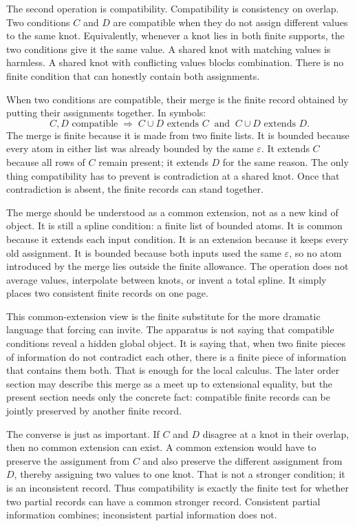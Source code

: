 The second operation is compatibility. Compatibility is consistency on overlap.
Two conditions \(C\) and \(D\) are compatible when they do not assign different
values to the same knot. Equivalently, whenever a knot lies in both finite
supports, the two conditions give it the same value. A shared knot with matching
values is harmless. A shared knot with conflicting values blocks combination.
There is no finite condition that can honestly contain both assignments.

When two conditions are compatible, their merge is the finite record obtained
by putting their assignments together. In symbols:
\[
  C, D \text{ compatible}
  \;\Longrightarrow\;
  C \cup D \text{ extends } C \ \text{ and }\ C \cup D \text{ extends } D.
\]
The merge is finite because it is made from two finite lists. It is bounded
because every atom in either list was already bounded by the same
\(\varepsilon\). It extends \(C\) because all rows of \(C\) remain present; it
extends \(D\) for the same reason. The only thing compatibility has to prevent
is contradiction at a shared knot. Once that contradiction is absent, the
finite records can stand together.

The merge should be understood as a common extension, not as a new kind of
object. It is still a spline condition: a finite list of bounded atoms. It is
common because it extends each input condition. It is an extension because it
keeps every old assignment. It is bounded because both inputs used the same
\(\varepsilon\), so no atom introduced by the merge lies outside the finite
allowance. The operation does not average values, interpolate between knots, or
invent a total spline. It simply places two consistent finite records on one
page.

This common-extension view is the finite substitute for the more dramatic
language that forcing can invite. The apparatus is not saying that compatible
conditions reveal a hidden global object. It is saying that, when two finite
pieces of information do not contradict each other, there is a finite piece of
information that contains them both. That is enough for the local calculus. The
later order section may describe this merge as a meet up to extensional
equality, but the present section needs only the concrete fact: compatible
finite records can be jointly preserved by another finite record.

The converse is just as important. If \(C\) and \(D\) disagree at a knot in
their overlap, then no common extension can exist. A common extension would have
to preserve the assignment from \(C\) and also preserve the different assignment
from \(D\), thereby assigning two values to one knot. That is not a stronger
condition; it is an inconsistent record. Thus compatibility is exactly the
finite test for whether two partial records can have a common stronger record.
Consistent partial information combines; inconsistent partial information does
not.

